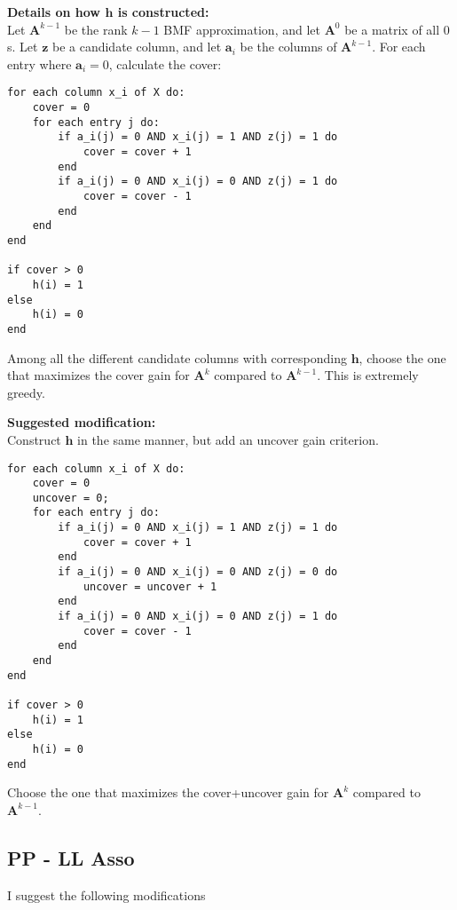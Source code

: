 \documentclass[12pt]{article}
\begin{document}
\textbf{Details on how $\mathbf{h}$ is constructed:} \\
 Let $\mathbf{A}^{k-1}$ be the rank $k-1$ BMF approximation, and let $\mathbf{A}^{0}$ be a matrix of all $0$s. 
Let $\mathbf{z}$ be a candidate column, and let $\mathbf{a}_i$ be the columns of  $\mathbf{A}^{k-1}$.
For each entry where $\mathbf{a}_i = 0$, calculate the cover:\\
\begin{verbatim}
for each column x_i of X do: 
    cover = 0 
    for each entry j do:
        if a_i(j) = 0 AND x_i(j) = 1 AND z(j) = 1 do
            cover = cover + 1 
        end 
        if a_i(j) = 0 AND x_i(j) = 0 AND z(j) = 1 do
            cover = cover - 1 
        end
    end
end 

if cover > 0
    h(i) = 1
else
    h(i) = 0
end
\end{verbatim}
Among all the different candidate columns with corresponding $\mathbf{h}$, choose the one that maximizes the cover gain for $\mathbf{A}^{k}$ compared to $\mathbf{A}^{k-1}$.
This is extremely greedy.

\textbf{Suggested modification:} \\
Construct $\mathbf{h}$ in the same manner, but add an uncover gain criterion. \\
\begin{verbatim}
for each column x_i of X do: 
    cover = 0 
    uncover = 0;
    for each entry j do:
        if a_i(j) = 0 AND x_i(j) = 1 AND z(j) = 1 do
            cover = cover + 1 
        end
        if a_i(j) = 0 AND x_i(j) = 0 AND z(j) = 0 do
            uncover = uncover + 1 
        end  
        if a_i(j) = 0 AND x_i(j) = 0 AND z(j) = 1 do
            cover = cover - 1 
        end
    end
end 

if cover > 0
    h(i) = 1
else
    h(i) = 0
end
\end{verbatim}
Choose the one that maximizes the cover+uncover gain for $\mathbf{A}^{k}$ compared to $\mathbf{A}^{k-1}$.


\subsection{PP -  LL Asso} %

I suggest the following modifications 
\end{document}
